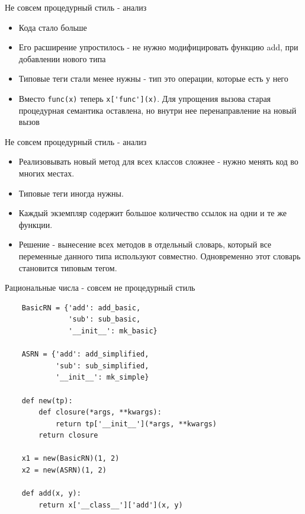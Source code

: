 \documentclass{article}
\begin{document}
\begin{center} Не совсем процедурный стиль - анализ \end{center}
\begin{itemize}
    \item Кода стало больше
    \item Его расширение упростилось - не нужно модифицировать функцию add,
          при добавлении нового типа
    \item Типовые теги стали менее нужны - тип это операции, которые есть у него
    \item Вместо \lstinline!func(x)! теперь \lstinline!x['func'](x)!. 
          Для упрощения вызова старая процедурная семантика оставлена,
          но внутри нее перенаправление на новый вызов
\end{itemize}
\newpage

\begin{center} Не совсем процедурный стиль - анализ \end{center}
\begin{itemize}
    \item Реализовывать новый метод для всех классов сложнее - нужно менять 
          код во многих местах.
    \item Типовые теги иногда нужны.
    \item Каждый экземпляр содержит большое количество ссылок на одни и те же
          функции.
    \item Решение - вынесение всех методов в отдельный словарь, который все 
          переменные данного типа используют совместно. Одновременно этот
          словарь становится типовым тегом.
\end{itemize}
\newpage

\begin{center} Рациональные числа - совсем не процедурный стиль \end{center}
\begin{lstlisting}
    BasicRN = {'add': add_basic, 
               'sub': sub_basic,
               '__init__': mk_basic}

    ASRN = {'add': add_simplified, 
            'sub': sub_simplified,
            '__init__': mk_simple}

    def new(tp):
        def closure(*args, **kwargs):
            return tp['__init__'](*args, **kwargs)
        return closure

    x1 = new(BasicRN)(1, 2)
    x2 = new(ASRN)(1, 2)

    def add(x, y):
        return x['__class__']['add'](x, y)
\end{lstlisting}
\newpage
\end{document}
